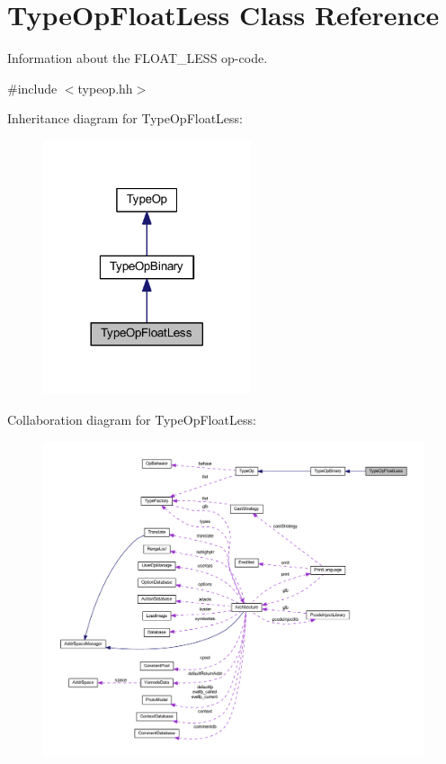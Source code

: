 \hypertarget{class_type_op_float_less}{}\section{Type\+Op\+Float\+Less Class Reference}
\label{class_type_op_float_less}


Information about the F\+L\+O\+A\+T\+\_\+\+L\+E\+SS op-\/code.  




{\ttfamily \#include $<$typeop.\+hh$>$}



Inheritance diagram for Type\+Op\+Float\+Less\+:
\nopagebreak
\begin{figure}[H]
\begin{center}
\leavevmode
\includegraphics[width=173pt]{class_type_op_float_less__inherit__graph}
\end{center}
\end{figure}


Collaboration diagram for Type\+Op\+Float\+Less\+:
\nopagebreak
\begin{figure}[H]
\begin{center}
\leavevmode
\includegraphics[width=350pt]{class_type_op_float_less__coll__graph}
\end{center}
\end{figure}
